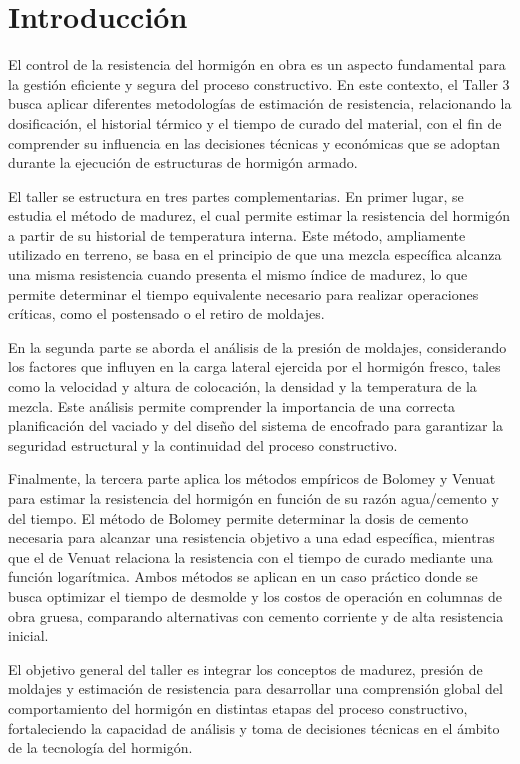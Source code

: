 \section{Introducción}

El control de la resistencia del hormigón en obra es un aspecto fundamental para la gestión eficiente y segura del proceso constructivo. En este contexto, el Taller 3 busca aplicar diferentes metodologías de estimación de resistencia, relacionando la dosificación, el historial térmico y el tiempo de curado del material, con el fin de comprender su influencia en las decisiones técnicas y económicas que se adoptan durante la ejecución de estructuras de hormigón armado.

El taller se estructura en tres partes complementarias. En primer lugar, se estudia el método de madurez, el cual permite estimar la resistencia del hormigón a partir de su historial de temperatura interna. Este método, ampliamente utilizado en terreno, se basa en el principio de que una mezcla específica alcanza una misma resistencia cuando presenta el mismo índice de madurez, lo que permite determinar el tiempo equivalente necesario para realizar operaciones críticas, como el postensado o el retiro de moldajes.

En la segunda parte se aborda el análisis de la presión de moldajes, considerando los factores que influyen en la carga lateral ejercida por el hormigón fresco, tales como la velocidad y altura de colocación, la densidad y la temperatura de la mezcla. Este análisis permite comprender la importancia de una correcta planificación del vaciado y del diseño del sistema de encofrado para garantizar la seguridad estructural y la continuidad del proceso constructivo.

Finalmente, la tercera parte aplica los métodos empíricos de Bolomey y Venuat para estimar la resistencia del hormigón en función de su razón agua/cemento y del tiempo. El método de Bolomey permite determinar la dosis de cemento necesaria para alcanzar una resistencia objetivo a una edad específica, mientras que el de Venuat relaciona la resistencia con el tiempo de curado mediante una función logarítmica. Ambos métodos se aplican en un caso práctico donde se busca optimizar el tiempo de desmolde y los costos de operación en columnas de obra gruesa, comparando alternativas con cemento corriente y de alta resistencia inicial.

El objetivo general del taller es integrar los conceptos de madurez, presión de moldajes y estimación de resistencia para desarrollar una comprensión global del comportamiento del hormigón en distintas etapas del proceso constructivo, fortaleciendo la capacidad de análisis y toma de decisiones técnicas en el ámbito de la tecnología del hormigón.